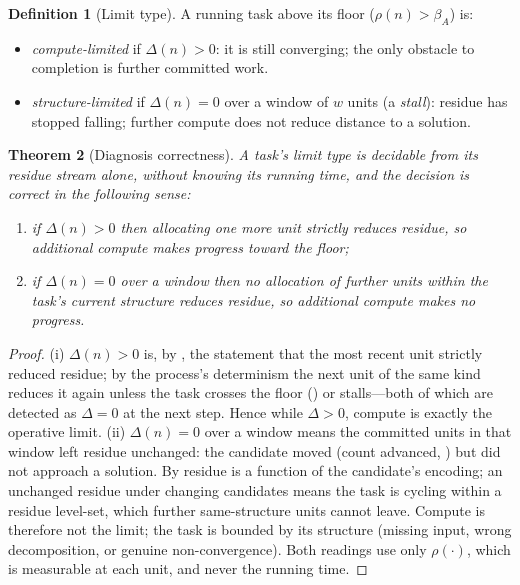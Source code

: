 \documentclass[twocolumn,10pt,a4paper]{article}
\theoremstyle{thmstyle}
\newtheorem{theorem}{Theorem}[section]
\theoremstyle{definition}
\newtheorem{definition}[theorem]{Definition}
\theoremstyle{remark}
\newcommand{\floor}{\beta}
\newcommand{\res}{\rho}
\begin{document}
\begin{definition}[Limit type]
\label{def:limit}
A running task above its floor ($\res(n)>\floor_A$) is:
\begin{itemize}[leftmargin=1.4em,itemsep=2pt]
\item \emph{compute-limited} if $\Delta(n)>0$: it is still converging;
the only obstacle to completion is further committed work.
\item \emph{structure-limited} if $\Delta(n)=0$ over a window of $w$
units (a \emph{stall}): residue has stopped falling; further compute does
not reduce distance to a solution.
\end{itemize}
\end{definition}

\begin{theorem}[Diagnosis correctness]
\label{thm:diagnosis}
A task's limit type is decidable from its residue stream alone, without
knowing its running time, and the decision is correct in the following
sense:
\begin{enumerate}[label=\textup{(\roman*)},leftmargin=2.2em,itemsep=2pt]
\item if $\Delta(n)>0$ then allocating one more unit strictly reduces
residue, so additional compute makes progress toward the floor;
\item if $\Delta(n)=0$ over a window then no allocation of further
units within the task's current structure reduces residue, so additional
compute makes no progress.
\end{enumerate}
\end{theorem}

\begin{proof}
(i) $\Delta(n)>0$ is, by , the statement that the most
recent unit strictly reduced residue; by the process's determinism the
next unit of the same kind reduces it again unless the task crosses the
floor () or stalls---both of which are detected as
$\Delta=0$ at the next step. Hence while $\Delta>0$, compute is exactly
the operative limit.
(ii) $\Delta(n)=0$ over a window means the committed units in that window
left residue unchanged: the candidate moved (count advanced,
) but did not approach a solution. By
 residue is a function of the candidate's encoding; an
unchanged residue under changing candidates means the task is cycling
within a residue level-set, which further same-structure units cannot
leave. Compute is therefore not the limit; the task is bounded by its
structure (missing input, wrong decomposition, or genuine
non-convergence). Both readings use only $\res(\cdot)$, which is
measurable at each unit, and never the running time.
\end{proof}
\end{document}
